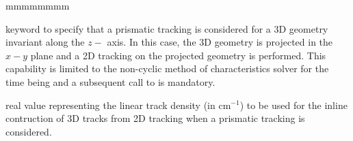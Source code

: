\begin{ListeDeDescription}{mmmmmmmm}
\item[\moc{PRIZ}] keyword to specify that a prismatic tracking is considered for a 3D geometry invariant along the $z-$ axis. In this case, the 3D geometry is projected in the $x-y$ plane and a 2D tracking on the projected geometry is performed. This capability is limited to the non-cyclic method of characteristics solver for the time being and a subsequent call to  is mandatory.

\item[\dusa{denspr}] real value representing the linear track density (in cm$^{-1}$) to be used for the inline contruction of 3D tracks from 2D tracking when a prismatic tracking is considered.

\end{ListeDeDescription}
\clearpage
